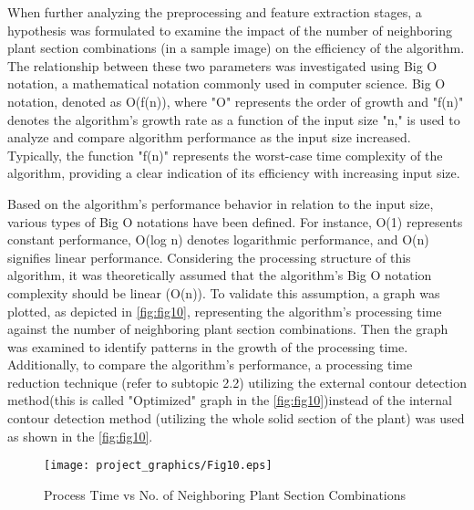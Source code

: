 \documentclass[]{iat}
\begin{document}
\par
When further analyzing the preprocessing and feature extraction stages, a hypothesis was formulated to examine the impact of the number of neighboring plant section combinations (in a sample image) on the efficiency of the algorithm. The relationship between these two parameters was investigated using Big O notation, a mathematical notation commonly used in computer science. Big O notation, denoted as O(f(n)), where "O" represents the order of growth and "f(n)" denotes the algorithm's growth rate as a function of the input size "n," is used to analyze and compare algorithm performance as the input size increased. Typically, the function "f(n)" represents the worst-case time complexity of the algorithm, providing a clear indication of its efficiency with increasing input size.
\par
Based on the algorithm's performance behavior in relation to the input size, various types of Big O notations have been defined. For instance, O(1) represents constant performance, O(log n) denotes logarithmic performance, and O(n) signifies linear performance. Considering the processing structure of this algorithm, it was theoretically assumed that the algorithm's Big O notation complexity should be linear (O(n)). To validate this assumption, a graph was plotted, as depicted in \autoref{fig:fig10}, representing the algorithm's processing time against the number of neighboring plant section combinations. Then the graph was examined to identify patterns in the growth of the processing time. Additionally, to compare the algorithm's performance, a processing time reduction technique (refer to subtopic 2.2) utilizing the external contour detection method(this is called "Optimized" graph in the \autoref{fig:fig10})instead of the internal contour detection method (utilizing the whole solid section of the plant) was used as shown in the \autoref{fig:fig10}.
\par
\FloatBarrier
\begin{figure}[h]
	\texttt{[image: project\_graphics/Fig10.eps]}
	\caption{Process Time vs No. of Neighboring Plant Section Combinations }
	\label{fig:fig10}
\end{figure}
\end{document}
